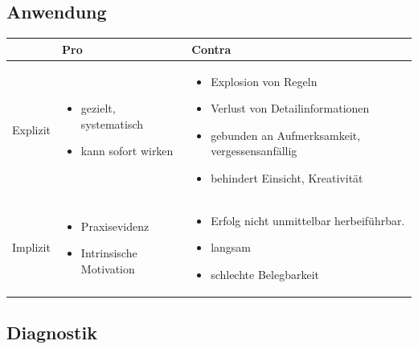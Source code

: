 \subsection{Anwendung}
\begin{tabular}{p{} | p{} | p{}}
  & Pro & Contra \\ \hline 
  Explizit & 
    \begin{itemize}[noitemsep,nolistsep]
      \item gezielt, systematisch
      \item kann sofort wirken
    \end{itemize} &
    \begin{itemize}[noitemsep,nolistsep]
      \item Explosion von Regeln
      \item Verlust von Detailinformationen
      \item gebunden an Aufmerksamkeit, vergessensanfällig
      \item behindert Einsicht, Kreativität
    \end{itemize}\\ \hline
  Implizit & 
    \begin{itemize}[noitemsep,nolistsep]
      \item Praxisevidenz
      \item Intrinsische Motivation
    \end{itemize} & 
    \begin{itemize}[noitemsep,nolistsep]
      \item Erfolg nicht unmittelbar herbeiführbar.
      \item langsam
      \item schlechte Belegbarkeit
    \end{itemize}\\ \hline
\end{tabular}

\subsection{Diagnostik}
